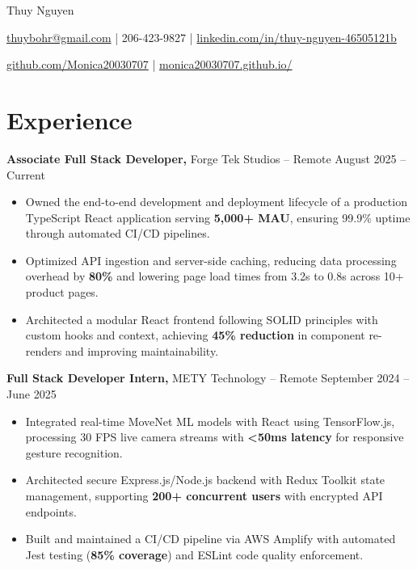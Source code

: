 \documentclass[11pt]{article}
\begin{document}
\centerline{\Huge Thuy Nguyen}

\vspace{5pt}

\centerline{\href{mailto:thuybohr@gmail.com}{thuybohr@gmail.com} | 206-423-9827 |
\href{https://www.linkedin.com/in/thuy-nguyen-46505121b/}{linkedin.com/in/thuy-nguyen-46505121b}}

\centerline{\href{https://github.com/Monica20030707}{github.com/Monica20030707} |
\href{https://monica20030707.github.io/}{monica20030707.github.io/}}

\vspace{-9pt}

\section*{Experience}

\textbf{Associate Full Stack Developer,} {Forge Tek Studios} -- Remote \hfill August 2025 -- Current
\vspace{-9pt}
\begin{itemize}
  \item Owned the end-to-end development and deployment lifecycle of a production TypeScript React application serving \textbf{5,000+ MAU}, ensuring 99.9\% uptime through automated CI/CD pipelines.
  \item Optimized API ingestion and server-side caching, reducing data processing overhead by \textbf{80\%} and lowering page load times from 3.2s to 0.8s across 10+ product pages.
  \item Architected a modular React frontend following SOLID principles with custom hooks and context, achieving \textbf{45\% reduction} in component re-renders and improving maintainability.
\end{itemize}

\textbf{Full Stack Developer Intern,} {METY Technology} -- Remote \hfill September 2024 -- June 2025
\vspace{-9pt}
\begin{itemize}
  \item Integrated real-time MoveNet ML models with React using TensorFlow.js, processing 30 FPS live camera streams with \textbf{<50ms latency} for responsive gesture recognition.
  \item Architected secure Express.js/Node.js backend with Redux Toolkit state management, supporting \textbf{200+ concurrent users} with encrypted API endpoints.
  \item Built and maintained a CI/CD pipeline via AWS Amplify with automated Jest testing (\textbf{85\% coverage}) and ESLint code quality enforcement.
\end{itemize}
\end{document}
